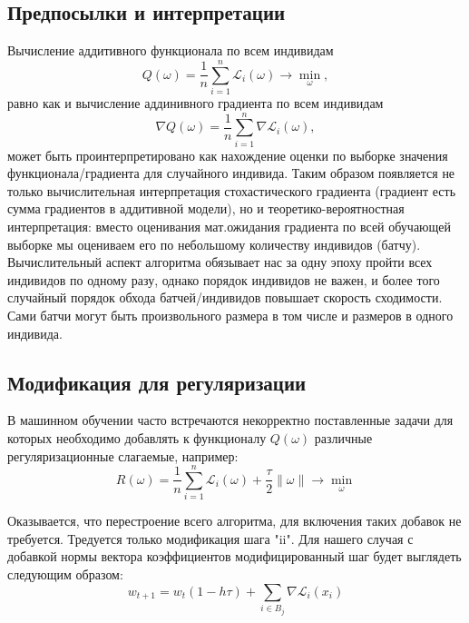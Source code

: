 \documentclass{article}
\begin{document}
\subsection{Предпосылки и интерпретации}
Вычисление аддитивного функционала по всем индивидам
$$
Q(\omega) = \frac{1}{n}\sum\limits_{i=1}^{n}\mathcal{L}_i(\omega) \to \underset{\omega}{\min},
$$
равно как и вычисление аддинивного градиента по всем индивидам
$$
\nabla Q(\omega) = \frac{1}{n}\sum\limits_{i=1}^{n}\nabla \mathcal{L}_i(\omega),
$$
может быть проинтерпретировано как нахождение оценки по выборке значения функционала/градиента для случайного индивида. Таким образом появляется не только вычислительная интерпретация стохастического градиента (градиент есть сумма градиентов в аддитивной модели), но и теоретико-вероятностная интерпретация: вместо оценивания мат.ожидания градиента по всей обучающей выборке мы оцениваем его по небольшому количеству индивидов (батчу). Вычислительный аспект алгоритма обязывает нас за одну эпоху пройти всех индивидов по одному разу, однако порядок индивидов не важен, и более того случайный порядок обхода батчей/индивидов повышает скорость сходимости. Сами батчи могут быть произвольного размера в том числе и размеров в одного индивида.
\subsection{Модификация для регуляризации}
В машинном обучении часто встречаются некорректно поставленные задачи для которых необходимо добавлять к функционалу $Q(\omega)$ различные регуляризационные слагаемые, например: 
$$
R(\omega) = \frac{1}{n}\sum\limits_{i=1}^{n}\mathcal{L}_i(\omega) + \frac{\tau}{2} \left \| \omega \right \| \to \underset{\omega}{\min}
$$

Оказывается, что перестроение всего алгоритма, для включения таких добавок не требуется. Тредуется только модификация шага "ii". Для нашего случая с добавкой нормы вектора коэффициентов модифицированный шаг будет выглядеть следующим образом:
$$w_{t+1} = w_{t}(1-h\tau) + \sum\limits_{i \in B_j}\nabla \mathcal{L}_i(x_i)$$
\end{document}
